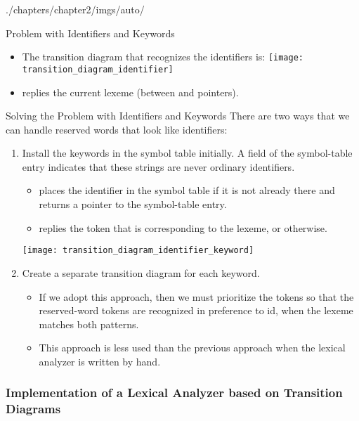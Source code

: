 \begin{graphicspathcontext}{{./chapters/chapter2/imgs/auto/}}
\begin{bibunit}[apalike]
\begin{frame}{Problem with Identifiers and Keywords}
	\begin{itemize}
	\item The transition diagram that recognizes the identifiers is:
	\vfill
		\texttt{[image: transition\_diagram\_identifier]}
	\vfill
	\item {} replies the current lexeme (between  and  pointers).
	\end{itemize}
	\vfill
\end{frame}

\begin{frame}{Solving the Problem with Identifiers and Keywords}
	There are two ways that we can handle reserved words that look like identifiers:
	\begin{enumerate}
	\item Install the keywords in the symbol table initially. A field of the symbol-table entry indicates that these strings are never ordinary identifiers.
		\begin{itemize}
		\item {} places the identifier in the symbol table if it is not already there and returns a pointer to the symbol-table entry.
		\item {} replies the token that is corresponding to the lexeme, or  otherwise.
		\end{itemize}
		\vfill
		\texttt{[image: transition\_diagram\_identifier\_keyword]}
	\item Create a separate transition diagram for each keyword.
		\begin{itemize}
		\item If we adopt this approach, then we must prioritize the tokens so that the reserved-word tokens are recognized in preference to id, when the lexeme matches both patterns.
		\item This approach is less used than the previous approach when the lexical analyzer is written by hand.
		\end{itemize}
	\end{enumerate}
\end{frame}

\subsubsection{Implementation of a Lexical Analyzer based on Transition Diagrams}


\end{bibunit}
\end{graphicspathcontext}
